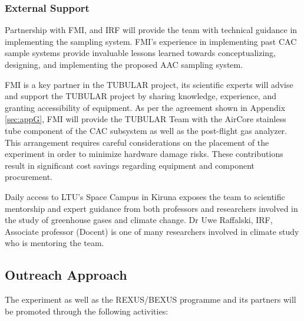 \documentclass[a4paper,12pt,oneside]{article} %
\begin{document}
\subsubsection{External Support}

Partnership with FMI, and IRF will provide the team with technical guidance in implementing the sampling system. FMI’s experience in implementing past CAC sample systems provide invaluable lessons learned towards conceptualizing, designing, and implementing the proposed AAC sampling system.

FMI is a key partner in the TUBULAR project, its scientific experts will advise and support the TUBULAR project by sharing knowledge, experience, and granting accessibility of equipment. As per the agreement shown in Appendix \ref{sec:appG}, FMI will provide the TUBULAR Team with the AirCore stainless tube component of the CAC subsystem as well as the post-flight gas analyzer. This arrangement requires careful considerations on the placement of the experiment in order to minimize hardware damage risks. These contributions result in significant cost savings regarding equipment and component procurement.

Daily access to LTU's Space Campus in Kiruna exposes the team to scientific mentorship and expert guidance from both professors and researchers involved in the study of greenhouse gases and climate change. Dr Uwe Raffalski, IRF, Associate professor (Docent) is one of many researchers involved in climate study who is mentoring the team.
\pagebreak

\subsection{Outreach Approach}

The experiment as well as the REXUS/BEXUS programme and its partners will be promoted through the following activities:
\end{document}
